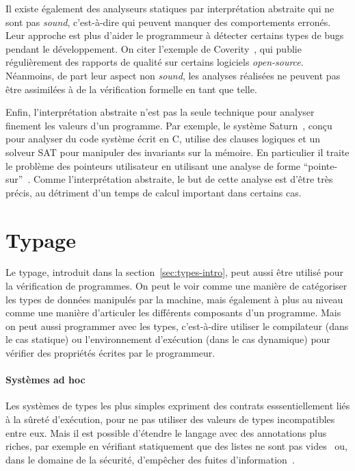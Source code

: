 Il existe également des analyseurs statiques par interprétation abstraite qui ne
sont pas \emph{sound}, c'est-à-dire qui peuvent manquer des comportements
erronés. Leur approche est plus d'aider le programmeur à détecter certains types
de bugs pendant le développement. On citer l'exemple de
Coverity~\cite{coverityBillion}, qui publie régulièrement des rapports de
qualité sur certains logiciels \emph{open-source}. Néanmoins, de part leur
aspect non \emph{sound}, les analyses réalisées ne peuvent pas être assimilées à
de la vérification formelle en tant que telle.

Enfin, l'interprétation abstraite n'est pas la seule technique pour analyser
finement les valeurs d'un programme. Par exemple, le système
Saturn~\cite{paste07}, conçu pour analyser du code système écrit en C, utilise
des clauses logiques et un solveur SAT pour manipuler des invariants sur la
mémoire. En particulier il traite le problème des pointeurs utilisateur en
utilisant une analyse de forme \enquote{pointe-sur}~\cite{oakland08}. Comme
l'interprétation abstraite, le but de cette analyse est d'être très précis, au
détriment d'un temps de calcul important dans certains cas.

\section{Typage}

Le typage, introduit dans la section~\ref{sec:types-intro}, peut aussi être
utilisé pour la vérification de programmes. On peut le voir comme une manière de
catégoriser les types de données manipulés par la machine, mais également à plus
au niveau comme une manière d'articuler les différents composants d'un
programme. Mais on peut aussi programmer avec les types, c'est-à-dire utiliser
le compilateur (dans le cas statique) ou l'environnement d'exécution (dans le
cas dynamique) pour vérifier des propriétés écrites par le programmeur.

\paragraph{Systèmes ad hoc}

Les systèmes de types les plus simples expriment des contrats esssentiellement
liés à la sûreté d'exécution, pour ne pas utiliser des valeurs de types
incompatibles entre eux. Mais il est possible d'étendre le langage avec des
annotations plus riches, par exemple en vérifiant statiquement que des listes ne
sont pas vides~\cite{lightweight-static-capabilities} ou, dans le domaine de la
sécurité, d'empêcher des fuites d'information~\cite{LZ06a}.

